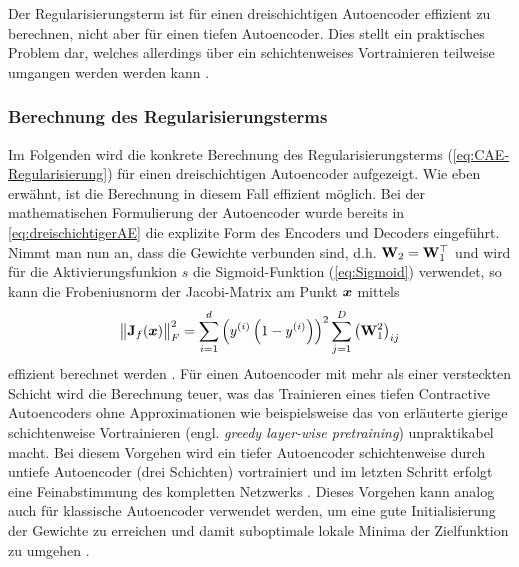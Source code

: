 Der Regularisierungsterm ist für einen dreischichtigen Autoencoder effizient zu berechnen, nicht
aber für einen tiefen Autoencoder. Dies stellt ein praktisches Problem dar, welches allerdings über
ein schichtenweises Vortrainieren teilweise umgangen werden werden kann \parencite[vgl.][522]{Goodfellow.2016}.

\subsubsection{Berechnung des Regularisierungsterms}
\label{ch:MethodenDerDimRed:ML:CAE:BerechnungRegTerm}
Im Folgenden wird die konkrete Berechnung des Regularisierungsterms (\eqref{eq:CAE-Regularisierung}) für einen dreischichtigen Autoencoder aufgezeigt. Wie eben erwähnt, ist die Berechnung in diesem Fall effizient möglich. Bei der mathematischen Formulierung der Autoencoder wurde bereits in \eqref{eq:dreischichtigerAE} die explizite Form des Encoders und Decoders eingeführt. Nimmt man nun an, dass die Gewichte verbunden sind, d.h. $\mathbf{W}_2 = \mathbf{W}_1^\top$ und wird für die Aktivierungsfunkion $s$ die Sigmoid-Funktion (\eqref{eq:Sigmoid})
verwendet, so kann die Frobeniusnorm der Jacobi-Matrix am Punkt $\bm{x}$ mittels
\begin{equation}
	\label{eq:CAE-loss-simple}
	\norm[\big]{\mat{J}_f(\vect{x})}_F^2 = \sum_{i = 1}^d \left( y^{(i)} \left( 1 - y^{(i)} \right) \right)^2 \sum_{j = 1}^D \big(\mat{W}_1^2\big)_{ij}
\end{equation}
effizient berechnet werden \parencite[4]{Rifai.2011a}. Für einen Autoencoder mit mehr als einer versteckten Schicht wird die
Berechnung teuer, was das Trainieren eines tiefen Contractive Autoencoders ohne Approximationen wie
beispielsweise das von \textcite{Bengio.2006} erläuterte gierige schichtenweise Vortrainieren
(engl. \textit{greedy layer-wise pretraining}) unpraktikabel macht. Bei diesem Vorgehen wird ein
tiefer Autoencoder schichtenweise durch untiefe Autoencoder (drei Schichten) vortrainiert und im
letzten Schritt erfolgt eine Feinabstimmung des kompletten Netzwerks \parencite[522]{Goodfellow.2016}. Dieses Vorgehen kann analog auch für klassische Autoencoder verwendet
werden, um eine gute Initialisierung der Gewichte zu erreichen und damit suboptimale lokale Minima
der Zielfunktion zu umgehen \parencite[509]{Goodfellow.2016}.